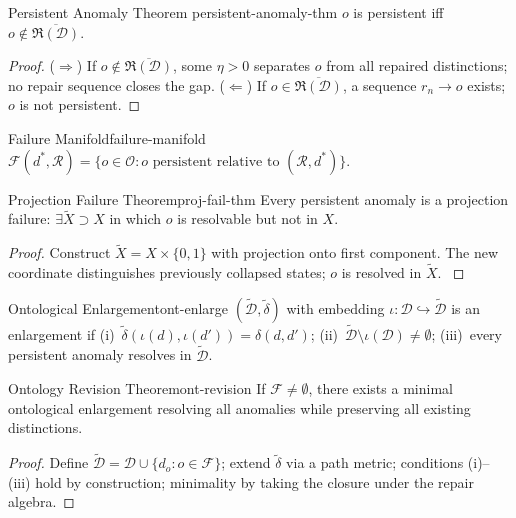 \documentclass[12pt,twoside,openright]{book}
\newcommand{\repair}{\mathfrak{R}}
\begin{document}
\begin{theorem}{Persistent Anomaly Theorem}%
  {persistent-anomaly-thm}
  $o$ is persistent iff
  $o\notin\overline{\repair(\mathcal{D})}$.
\end{theorem}
\begin{proof}
  ($\Rightarrow$) If $o\notin\overline{\repair(\mathcal{D})}$,
  some $\eta>0$ separates $o$ from all repaired
  distinctions; no repair sequence closes the gap.
  ($\Leftarrow$) If $o\in\overline{\repair(\mathcal{D})}$,
  a sequence $r_n\to o$ exists; $o$ is not persistent.
\end{proof}

\begin{definition}{Failure Manifold}{failure-manifold}
  $\mathcal{F}(d^*,\mathcal{R})=\{o\in\mathcal{O}:
  o\text{ persistent relative to }(\mathcal{R},d^*)\}$.
\end{definition}

\begin{theorem}{Projection Failure Theorem}{proj-fail-thm}
  Every persistent anomaly is a projection failure:
  $\exists\tilde{X}\supset X$ in which $o$ is resolvable
  but not in $X$.
\end{theorem}
\begin{proof}
  Construct $\tilde{X}=X\times\{0,1\}$ with projection
  onto first component. The new coordinate distinguishes
  previously collapsed states; $o$ is resolved in
  $\tilde{X}$. \parencite{kuhn1962structure}
\end{proof}

\begin{definition}{Ontological Enlargement}{ont-enlarge}
  $(\tilde{\mathcal{D}},\tilde\delta)$ with embedding
  $\iota:\mathcal{D}\hookrightarrow\tilde{\mathcal{D}}$ is
  an enlargement if (i)~$\tilde\delta(\iota(d),\iota(d'))
  =\delta(d,d')$; (ii)~$\tilde{\mathcal{D}}\setminus
  \iota(\mathcal{D})\ne\emptyset$;
  (iii)~every persistent anomaly resolves in
  $\tilde{\mathcal{D}}$.
\end{definition}

\begin{theorem}{Ontology Revision Theorem}{ont-revision}
  If $\mathcal{F}\ne\emptyset$, there exists a minimal
  ontological enlargement resolving all anomalies
  while preserving all existing distinctions.
\end{theorem}
\begin{proof}
  Define $\tilde{\mathcal{D}}=\mathcal{D}\cup
  \{d_o:o\in\mathcal{F}\}$; extend $\tilde\delta$ via
  a path metric; conditions (i)--(iii) hold by
  construction; minimality by taking the closure under
  the repair algebra.
\end{proof}
\end{document}

